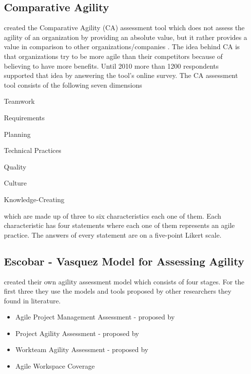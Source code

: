 \subsection{Comparative Agility} %
\citet{comparative_agility} created the Comparative Agility (CA) assessment tool which does not assess the agility of an organization by providing an absolute value, but it rather provides a value in comparison to other organizations/companies \cite{comparative_agility_web}. The idea behind CA is that organizations try to be more agile than their competitors because of believing to have more benefits. Until 2010 more than 1200 respondents supported that idea by answering the tool's online survey. The CA assessment tool consists of the following seven dimensions 
\begin{inparaenum} [a\upshape)]
	\item Teamwork
	\item Requirements
	\item Planning
	\item Technical Practices
	\item Quality
	\item Culture
	\item Knowledge-Creating
\end{inparaenum}
which are made up of three to six characteristics each one of them. Each characteristic has four statements where each one of them represents an agile practice. The answers of every statement are on a five-point Likert scale.

\subsection{Escobar - Vasquez Model for Assessing Agility} %

\citet{6427226} created their own agility assessment model which consists of four stages. For the first three they use the models and tools proposed by other researchers they found in literature.
\begin{itemize}
\item Agile Project Management Assessment - proposed by \citet{qumer2006measuring}
\item Project Agility Assessment - proposed by \citet{taylor}
\item Workteam Agility Assessment - proposed by \citet{Leffingwell}
\item Agile Workspace Coverage
\end{itemize}

